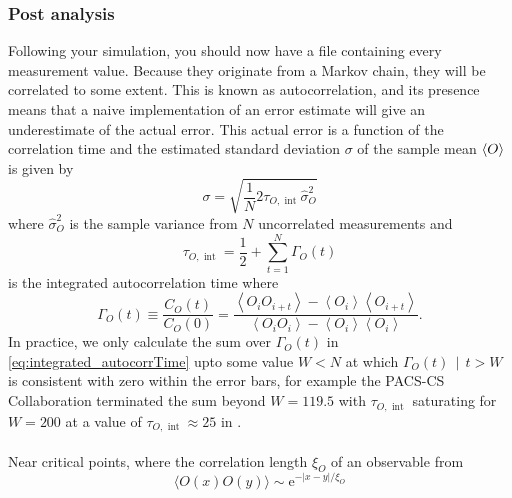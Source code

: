 \documentclass[a4paper,10pt]{article}
\begin{document}
\subsubsection{Post analysis}
Following your simulation, you should now have a file containing every measurement value. Because they originate from a Markov chain, they will be correlated to some extent. This is known as autocorrelation, and its presence means that a naive implementation of an error estimate will give an underestimate of the actual error. This actual error is a function of the correlation time and the estimated standard deviation  $\sigma$ of the sample mean $\braket{O}$ is given by
\begin{equation}
\sigma=\sqrt{\frac{1}{N} 2 \tau_{O, \text { int }} \widehat{\sigma}_{O}^{2}}
\end{equation}
where $\widehat{\sigma}_{O}^{2}$ is the sample variance from $N$ uncorrelated measurements and 
\begin{equation}\label{eq:integrated_autocorrTime}
\tau_{O, \text { int }} = \frac{1}{2}+\sum_{t=1}^{N} \Gamma_{O}(t)
\end{equation}
is the integrated autocorrelation time where 
\begin{equation}
\Gamma_{O}(t) \equiv \frac{C_{O}(t)}{C_{O}(0)} = \frac{\left\langle O_{i} O_{i+t}\right\rangle-\left\langle O_{i}\right\rangle\left\langle O_{i+t}\right\rangle}{\left\langle O_{i} O_{i}\right\rangle-\left\langle O_{i}\right\rangle\left\langle O_{i}\right\rangle}.
\end{equation}
\cite{L_scher_2003}
In practice, we only calculate the sum over $\Gamma_{O}(t)$ in \eqref{eq:integrated_autocorrTime} upto some value $W < N$ at which $\Gamma_{O}(t)\,\mid\,t>W$ is consistent with zero within the error bars, for example the PACS-CS Collaboration terminated the sum beyond $W=119.5$ with $\tau_{O, \text { int }}$ saturating for $W=200$ at a value of $\tau_{O, \text { int }}\approx 25$ in \cite{Aoki_2009}.\\\\Near critical points, where the correlation length $\xi_{O}$ of an observable from
\begin{equation}
\langle O(x) O(y)\rangle \sim \mathrm{e}^{-|x-y| / \xi_{O}}
\end{equation}
\end{document}
